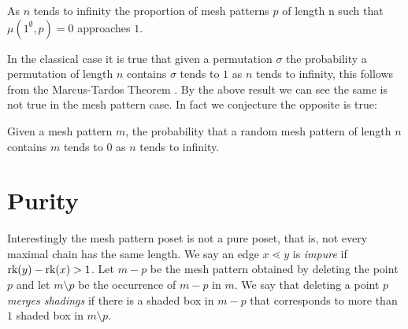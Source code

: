 \documentclass[11pt,a4paper,oneside]{article}
\begin{document}
\begin{cor}
As $n$ tends to infinity the proportion of mesh patterns $p$ of length n such
that $\mu(1^\emptyset,p)=0$ approaches $1$.
\end{cor}

In the classical case it is true that given a permutation $\sigma$ the
probability a permutation of length $n$ contains $\sigma$ tends to $1$ as $n$
tends to infinity, this follows from the Marcus-Tardos Theorem \cite{MT04}. By
the above result we can see the same is not true in the mesh pattern case. In
fact we conjecture the opposite is true:

\begin{conj}
Given a mesh pattern $m$, the probability that a random mesh pattern of length
$n$ contains $m$ tends to $0$ as $n$ tends to infinity.
\end{conj}




\section{Purity}

Interestingly the mesh pattern poset is not a pure poset, that is, not every
maximal chain has the same length. We say an edge $x\lessdot y$ is \emph{impure}
if $\operatorname{\textrm{rk}}(y)-\operatorname{\textrm{rk}}(x)>1$. Let $m-p$ be the mesh pattern obtained by deleting the
point $p$ and let $m\setminus p$ be the occurrence of $m-p$ in $m$. We say that
deleting a point $p$ \emph{merges shadings} if there is a shaded box in $m-p$
that corresponds to more than $1$ shaded box in $m\setminus p$.
\end{document}
